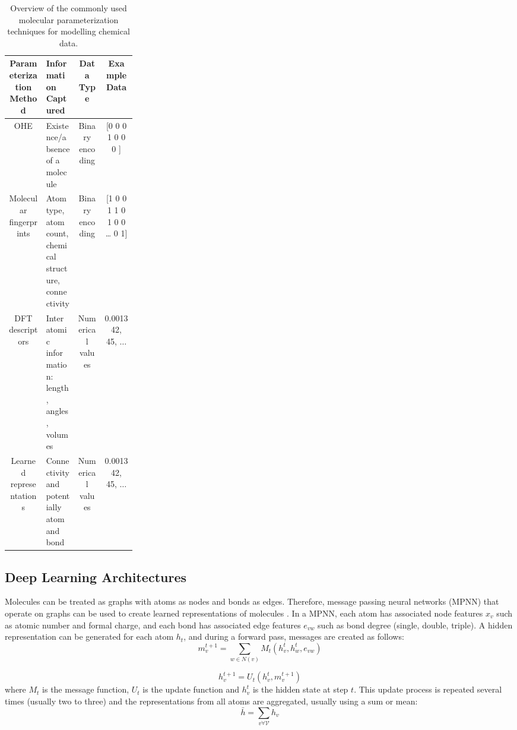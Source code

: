 \begin{sidewaystable}
    \caption{Overview of the commonly used molecular parameterization techniques for modelling chemical data.}
    \begin{tabular}{cp{0.25\linewidth}cc}
         Parameterization
    Method & Information Captured & Data Type & Example Data  \\
        \hline
         OHE & Existence/absence of a molecule & Binary encoding & [0 0 0 1 0 0 0 ] \\
         Molecular fingerprints & Atom type, atom count, chemical structure, connectivity & Binary encoding & [1 0 0 1 1 0 1 0 0 … 0 1] \\
         DFT descriptors & Inter atomic information: length, angles, volumes &  Numerical values & 0.001342, 45, $\dots$ \\
         Learned representations & Connectivity and potentially atom and bond & Numerical values & 0.001342, 45, $\dots$
    \end{tabular}
    \label{tab:parameterization}
\end{sidewaystable}

\subsection{Deep Learning Architectures}

Molecules can be treated as graphs with atoms as nodes and bonds as edges. Therefore, message passing neural networks (MPNN) that operate on graphs can be used to create learned representations of molecules \cite{Gilmer2017}.  In a MPNN, each atom has associated node features $x_v$ such as atomic number and formal charge, and each bond has associated edge features $e_{vw}$ such as bond degree (single, double, triple). A hidden representation can be generated for each atom $h_t$, and  during a forward pass, messages are created as follows:
\begin{equation}
    m_v^{t+1} = \sum_{w\in N(v)} M_t(h_v^t, h_w^t, e_{vw})
\end{equation}

\begin{equation}
    h_v^{t+1} = U_t(h_v^t, m_v^{t+1})
\end{equation}
where $M_t$ is the message function, $U_t$ is the update function and $h_v^{t}$ is the hidden state at step $t$. This update process is repeated several times (usually two to three) and the representations from all atoms are aggregated, usually using a sum or mean:
\begin{equation}
    \bar h = \sum_{v\forall \mathcal V} h_v
\end{equation}

